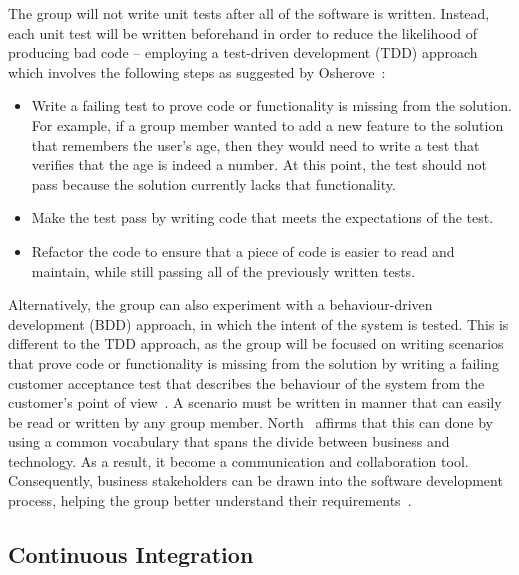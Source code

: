 The group will not write unit tests after all of the software is written. Instead, each unit test will be written beforehand in order to reduce the likelihood of producing bad code -- employing a test-driven development (TDD) approach which involves the following steps as suggested by Osherove~\parencite{book:art_of_unit_testing}:

\begin{itemize}
  \item Write a failing test to prove code or functionality is missing from the solution. For example, if a group member wanted to add a new feature to the solution that remembers the user’s age, then they would need to write a test that verifies that the age is indeed a number. At this point, the test should not pass because the solution currently lacks that functionality.
  \item Make the test pass by writing code that meets the expectations of the test.
  \item Refactor the code to ensure that a piece of code is easier to read and maintain, while still passing all of the previously written tests.
\end{itemize}

Alternatively, the group can also experiment with a behaviour-driven development (BDD) approach, in which the intent of the system is tested. This is different to the TDD approach, as the group will be focused on writing scenarios that prove code or functionality is missing from the solution by writing a failing customer acceptance test that describes the behaviour of the system from the customer’s point of view~\parencite{book:art_of_unit_testing}. A scenario must be written in manner that can easily be read or written by any group member. North~\parencite{web:behaviour_driven_development} affirms that this can done by using a common vocabulary that spans the divide between business and technology. As a result, it become a communication and collaboration tool. Consequently, business stakeholders can be drawn into the software development process, helping the group better understand their requirements~\parencite{web:behaviour_driven_development}.

\subsection{Continuous Integration}

